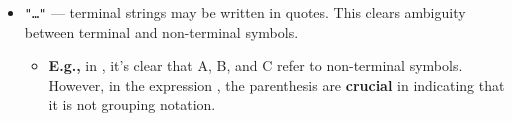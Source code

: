 \begin{Def}
\begin{itemize}
\begin{itemize}
        \end{itemize}
    \item \texttt{"\ldots"} — terminal strings may be written in quotes. This clears ambiguity between terminal and non-terminal symbols.
    \begin{itemize}
        \item \textbf{E.g.,} in , it's clear that A, B, and C refer to non-terminal symbols. However, in the expression , the parenthesis are \textbf{crucial} in indicating that it is not grouping notation.
    \end{itemize}
\end{itemize}
\end{Def}

\newpage

